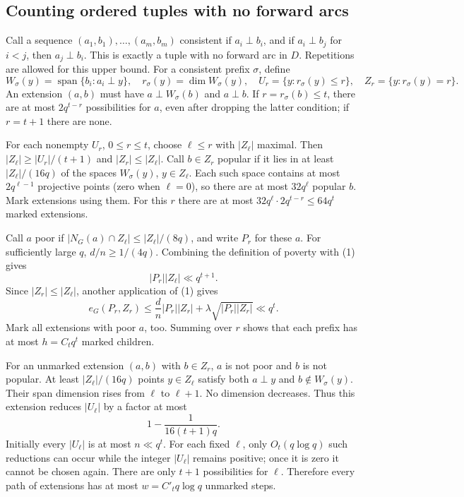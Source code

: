 \subsection*{Counting ordered tuples with no forward arcs}
Call a sequence $(a_1,b_1),\ldots,(a_m,b_m)$ consistent if $a_i\perp b_i$, and if
$a_i\perp b_j$ for $i<j$, then $a_j\perp b_i$.
This is exactly a tuple with no forward arc in $D$. Repetitions are allowed for this upper bound.
For a consistent prefix $\sigma$, define
\[
 W_\sigma(y)=\operatorname{span}\{b_i:a_i\perp y\},\quad
 r_\sigma(y)=\dim W_\sigma(y),\quad
 U_r=\{y:r_\sigma(y)\le r\},\quad Z_r=\{y:r_\sigma(y)=r\}.
\]
An extension $(a,b)$ must have $a\perp W_\sigma(b)$ and $a\perp b$.
If $r=r_\sigma(b)\le t$, there are at most $2q^{t-r}$ possibilities for $a$, even after dropping the latter condition; if $r=t+1$ there are none.

For each nonempty $U_r$, $0\le r\le t$, choose $\ell\le r$ with $|Z_\ell|$ maximal.
Then $|Z_\ell|\ge |U_r|/(t+1)$ and $|Z_r|\le|Z_\ell|$.
Call $b\in Z_r$ popular if it lies in at least $|Z_\ell|/(16q)$ of the spaces $W_\sigma(y)$, $y\in Z_\ell$.
Each such space contains at most $2q^{\ell-1}$ projective points (zero when $\ell=0$), so there are at most $32q^\ell$ popular $b$.
Mark extensions using them. For this $r$ there are at most
$32q^\ell\cdot2q^{t-r}\le64q^t$ marked extensions.

Call $a$ poor if $|N_G(a)\cap Z_\ell|\le |Z_\ell|/(8q)$, and write $P_r$ for these $a$.
For sufficiently large $q$, $d/n\ge1/(4q)$.
Combining the definition of poverty with (1) gives
\[
 |P_r||Z_\ell|\ll q^{t+1}.
\]
Since $|Z_r|\le|Z_\ell|$, another application of (1) gives
\[
 e_G(P_r,Z_r)\le\frac dn|P_r||Z_r|+
 \lambda\sqrt{|P_r||Z_r|}\ll q^t.
\]
Mark all extensions with poor $a$, too. Summing over $r$ shows that each prefix has at most $h=C_tq^t$ marked children.

For an unmarked extension $(a,b)$ with $b\in Z_r$, $a$ is not poor and $b$ is not popular. At least $|Z_\ell|/(16q)$ points $y\in Z_\ell$ satisfy both $a\perp y$ and $b\notin W_\sigma(y)$. Their span dimension rises from $\ell$ to $\ell+1$. No dimension decreases. Thus this extension reduces $|U_\ell|$ by a factor at most
\[
 1-\frac1{16(t+1)q}.
\]
Initially every $|U_\ell|$ is at most $n\ll q^t$. For each fixed $\ell$, only $O_t(q\log q)$ such reductions can occur while the integer $|U_\ell|$ remains positive; once it is zero it cannot be chosen again. There are only $t+1$ possibilities for $\ell$. Therefore every path of extensions has at most
$w=C'_tq\log q$ unmarked steps.

